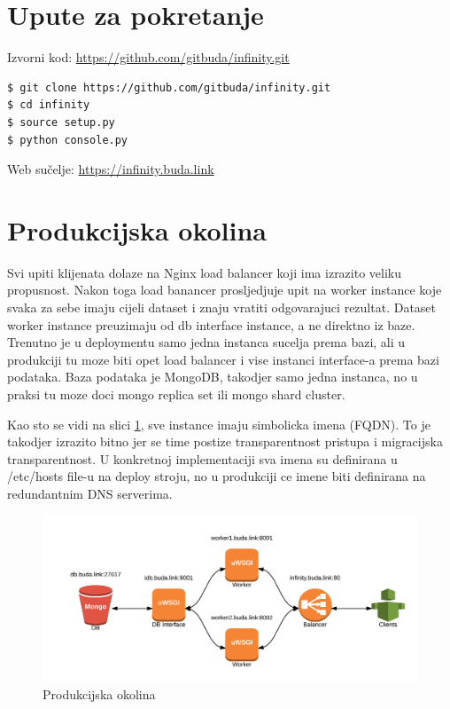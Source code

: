 \documentclass[a4paper,12pt]{article}
\begin{document}
\section{Upute za pokretanje}

Izvorni kod: \url{https://github.com/gitbuda/infinity.git}

\begin{lstlisting}[language=bash]
$ git clone https://github.com/gitbuda/infinity.git
$ cd infinity
$ source setup.py
$ python console.py
\end{lstlisting}

Web sučelje: \url{https://infinity.buda.link}

\section{Produkcijska okolina}

Svi upiti klijenata dolaze na Nginx load balancer koji ima izrazito veliku propusnost. Nakon toga load banancer prosljedjuje upit na worker instance koje svaka za sebe imaju cijeli dataset i znaju vratiti odgovarajuci rezultat. Dataset worker instance preuzimaju od db interface instance, a ne direktno iz baze. Trenutno je u deploymentu samo jedna instanca sucelja prema bazi, ali u produkciji tu moze biti opet load balancer i vise instanci interface-a prema bazi podataka. Baza podataka je MongoDB, takodjer samo jedna instanca, no u praksi tu moze doci mongo replica set ili mongo shard cluster.

Kao sto se vidi na slici \ref{production_environment}, sve instance imaju simbolicka imena (FQDN). To je takodjer izrazito bitno jer se time postize transparentnost pristupa i migracijska transparentnost. U konkretnoj implementaciji sva imena su definirana u /etc/hosts file-u na deploy stroju, no u produkciji ce imene biti definirana na redundantnim DNS serverima.

\begin{figure}[!htbp]
\begin{center}
\includegraphics[width=\textwidth]{infinity.png}
\end{center}
\caption{Produkcijska okolina}\label{production_environment}
\end{figure}
\end{document}
